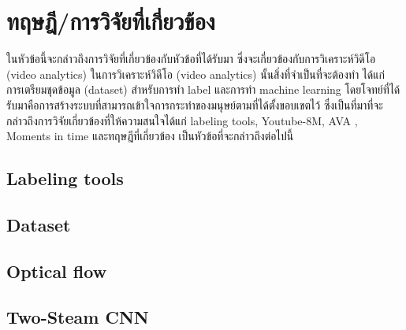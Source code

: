 \clearpage
\chapter{ทฤษฎี/การวิจัยที่เกี่ยวข้อง}
ในหัวข้อนี้จะกล่าวถึงการวิจัยที่เกี่ยวข้องกับหัวข้อที่ได้รับมา ซึ่งจะเกี่ยวข้องกับการวิเคราะห์วิดีโอ (video analytics) ในการวิเคราะห์วิดีโอ (video analytics) นั้นสิ่งที่จำเป็นที่จะต้องทำ ได้แก่ การเตรียมชุดข้อมูล (dataset) สำหรับการทำ label และการทำ machine learning โดยโจทย์ที่ได้รับมาคือการสร้างระบบที่สามารถเข้าใจการกระทำของมนุษย์ตามที่ได้ตั้งขอบเขตไว้ ซึ่งเป็นที่มาที่จะกล่าวถึงการวิจัยเกี่ยวข้องที่ให้ความสนใจได้แก่ labeling tools, Youtube-8M, AVA , Moments in time และทฤษฎีที่เกี่ยวข้อง เป็นหัวข้อที่จะกล่าวถึงต่อไปนี้


\section{Labeling tools}


\clearpage
\section{Dataset}

\clearpage

\clearpage


\clearpage
\section{Optical flow}


\section{Two-Steam CNN}


